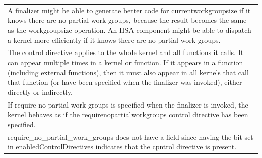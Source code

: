 \documentclass[final]{book}
\begin{document}
\begin{longtable}{@{\hspace{2em}}p{\linewidth-2em}}
A finalizer might be able to generate better code for currentworkgroupsize if it knows there are no partial work-groups, because the result becomes the same as the workgroupsize operation. An HSA component might be able to dispatch a kernel more efficiently if it knows there are no partial work-groups.\\[2mm]
The control directive applies to the whole kernel and all functions it calls. It can appear multiple times in a kernel or function. If it appears in a function (including external functions), then it must also appear in all kernels that call that function (or have been specified when the finalizer was invoked), either directly or indirectly.\\[2mm]
If require no partial work-groups is specified when the finalizer is invoked, the kernel behaves as if the requirenopartialworkgroups control directive has been specified.\\[2mm]
require_\-no_\-partial_\-work_\-groups does not have a field since having the bit set in enabledControlDirectives indicates that the cpntrol directive is present.
\end{longtable}
\end{document}
